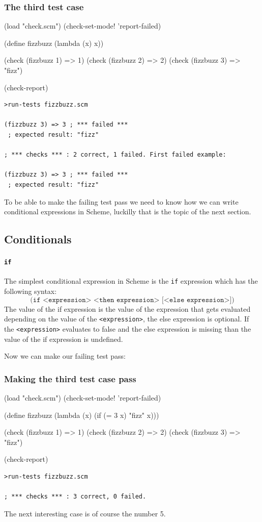 \documentclass[12pt,a4paper,english,twoside]{article}
\begin{document}
\subsubsection{The third test case}
\begin{schemecode}
(load "check.scm")
(check-set-mode! 'report-failed)

(define fizzbuzz (lambda (x) x))

(check (fizzbuzz 1) => 1)
(check (fizzbuzz 2) => 2)
(check (fizzbuzz 3) => "fizz")

(check-report)
\end{schemecode}
\begin{lstlisting}
>run-tests fizzbuzz.scm

(fizzbuzz 3) => 3 ; *** failed ***
 ; expected result: "fizz"

; *** checks *** : 2 correct, 1 failed. First failed example:

(fizzbuzz 3) => 3 ; *** failed ***
 ; expected result: "fizz"
\end{lstlisting}

To be able to make the failing test pass we need to know how we can write 
conditional expressions in Scheme, luckilly that is the topic of the next 
section.

\subsection{Conditionals}
\paragraph{\texttt{if}}
The simplest conditional expression in Scheme is the \texttt{if} expression 
which
has the following syntax:
\begin{equation*}
    \texttt{(if <expression> <then expression> [<else expression>])}
\end{equation*}
The value of the if expression is the value of the expression that gets 
evaluated depending on the value of the \texttt{<expression>}, the else 
expression is optional. If the \texttt{<expression>} evaluates to false and 
the else expression is missing than the value of the if expression is 
undefined.

Now we can make our failing test pass:
\subsubsection{Making the third test case pass}
\begin{schemecode}
(load "check.scm")
(check-set-mode! 'report-failed)

(define fizzbuzz (lambda (x) (if (= 3 x) "fizz" x)))

(check (fizzbuzz 1) => 1)
(check (fizzbuzz 2) => 2)
(check (fizzbuzz 3) => "fizz")

(check-report)
\end{schemecode}
\begin{lstlisting}
>run-tests fizzbuzz.scm

; *** checks *** : 3 correct, 0 failed.
\end{lstlisting}
The next interesting case is of course the number 5.  
\end{document}
